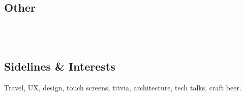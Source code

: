 \documentclass[]{cvpn}
\begin{document}
\begin{multicols}{2}
\subsection{Other}
\\
\\

\subsection{Sidelines \& Interests}
Travel, UX, design, touch screens,
trivia, architecture, tech talks, craft beer.

\end{multicols}
\end{document}
